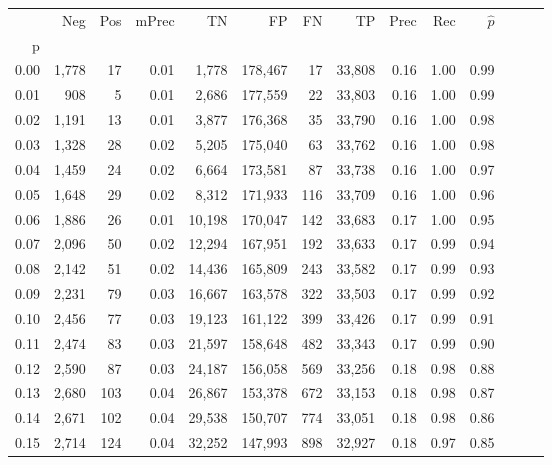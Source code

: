 \begin{tabular}{rrrrrrrrrrrrrr}
\toprule
{} &    Neg &  Pos & mPrec &       TN &       FP &      FN &      TP &  Prec &   Rec & $\hat{p}$ \\
p    &        &      &       &          &          &         &         &       &       &           \\
\midrule
0.00 &  1,778 &   17 &  0.01 &    1,778 &  178,467 &      17 &  33,808 &  0.16 &  1.00 &      0.99 \\
0.01 &    908 &    5 &  0.01 &    2,686 &  177,559 &      22 &  33,803 &  0.16 &  1.00 &      0.99 \\
0.02 &  1,191 &   13 &  0.01 &    3,877 &  176,368 &      35 &  33,790 &  0.16 &  1.00 &      0.98 \\
0.03 &  1,328 &   28 &  0.02 &    5,205 &  175,040 &      63 &  33,762 &  0.16 &  1.00 &      0.98 \\
0.04 &  1,459 &   24 &  0.02 &    6,664 &  173,581 &      87 &  33,738 &  0.16 &  1.00 &      0.97 \\
0.05 &  1,648 &   29 &  0.02 &    8,312 &  171,933 &     116 &  33,709 &  0.16 &  1.00 &      0.96 \\
0.06 &  1,886 &   26 &  0.01 &   10,198 &  170,047 &     142 &  33,683 &  0.17 &  1.00 &      0.95 \\
0.07 &  2,096 &   50 &  0.02 &   12,294 &  167,951 &     192 &  33,633 &  0.17 &  0.99 &      0.94 \\
0.08 &  2,142 &   51 &  0.02 &   14,436 &  165,809 &     243 &  33,582 &  0.17 &  0.99 &      0.93 \\
0.09 &  2,231 &   79 &  0.03 &   16,667 &  163,578 &     322 &  33,503 &  0.17 &  0.99 &      0.92 \\
0.10 &  2,456 &   77 &  0.03 &   19,123 &  161,122 &     399 &  33,426 &  0.17 &  0.99 &      0.91 \\
0.11 &  2,474 &   83 &  0.03 &   21,597 &  158,648 &     482 &  33,343 &  0.17 &  0.99 &      0.90 \\
0.12 &  2,590 &   87 &  0.03 &   24,187 &  156,058 &     569 &  33,256 &  0.18 &  0.98 &      0.88 \\
0.13 &  2,680 &  103 &  0.04 &   26,867 &  153,378 &     672 &  33,153 &  0.18 &  0.98 &      0.87 \\
0.14 &  2,671 &  102 &  0.04 &   29,538 &  150,707 &     774 &  33,051 &  0.18 &  0.98 &      0.86 \\
0.15 &  2,714 &  124 &  0.04 &   32,252 &  147,993 &     898 &  32,927 &  0.18 &  0.97 &      0.85 \\

\end{tabular}
